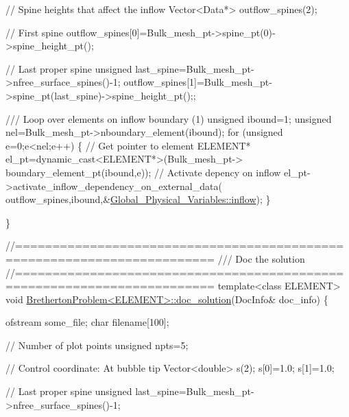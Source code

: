 \begin{DoxyCodeInclude}
 \textcolor{comment}{// Spine heights that affect the inflow}
 Vector<Data*> outflow\_spines(2);

 \textcolor{comment}{// First spine}
 outflow\_spines[0]=Bulk\_mesh\_pt->spine\_pt(0)->spine\_height\_pt();

 \textcolor{comment}{// Last proper spine}
 \textcolor{keywordtype}{unsigned} last\_spine=Bulk\_mesh\_pt->nfree\_surface\_spines()-1;
 outflow\_spines[1]=Bulk\_mesh\_pt->spine\_pt(last\_spine)->spine\_height\_pt();;


\textcolor{comment}{}
\textcolor{comment}{ /// Loop over elements on inflow boundary (1)}
\textcolor{comment}{} \textcolor{keywordtype}{unsigned} ibound=1;
 \textcolor{keywordtype}{unsigned} nel=Bulk\_mesh\_pt->nboundary\_element(ibound);
 \textcolor{keywordflow}{for} (\textcolor{keywordtype}{unsigned} e=0;e<nel;e++)
  \{
   \textcolor{comment}{// Get pointer to element}
   ELEMENT* el\_pt=\textcolor{keyword}{dynamic\_cast<}ELEMENT*\textcolor{keyword}{>}(Bulk\_mesh\_pt->
                                         boundary\_element\_pt(ibound,e));  
   \textcolor{comment}{// Activate depency on inflow}
   el\_pt->activate\_inflow\_dependency\_on\_external\_data(
    outflow\_spines,ibound,&\hyperlink{namespaceGlobal__Physical__Variables_a08e9835d71b7f7194ec5475f139211be}{Global\_Physical\_Variables::inflow});
  \}

\}



\textcolor{comment}{//========================================================================}\textcolor{comment}{}
\textcolor{comment}{/// Doc the solution}
\textcolor{comment}{}\textcolor{comment}{//========================================================================}
\textcolor{keyword}{template}<\textcolor{keyword}{class} ELEMENT>
\textcolor{keywordtype}{void} \hyperlink{classBrethertonProblem_ab6e29ecf0dbffabd4ce897203d35626e}{BrethertonProblem<ELEMENT>::doc\_solution}(DocInfo& doc\_info)
\{ 

 ofstream some\_file;
 \textcolor{keywordtype}{char} filename[100];

 \textcolor{comment}{// Number of plot points}
 \textcolor{keywordtype}{unsigned} npts=5; 

 \textcolor{comment}{// Control coordinate: At bubble tip}
 Vector<double> s(2);
 s[0]=1.0;
 s[1]=1.0;
 
 \textcolor{comment}{// Last proper spine}
 \textcolor{keywordtype}{unsigned} last\_spine=Bulk\_mesh\_pt->nfree\_surface\_spines()-1;


\end{DoxyCodeInclude}
